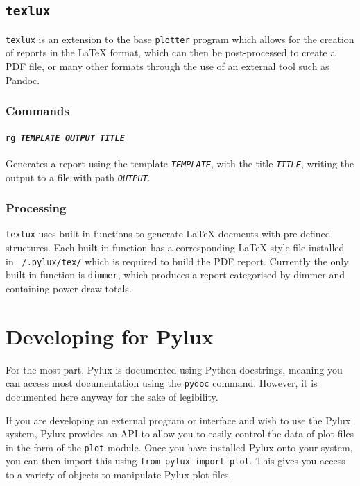 \documentclass[a4paper]{article}
\begin{document}
\subsection{\texttt{texlux}}
\texttt{texlux} is an extension to the base \texttt{plotter} program which allows for the creation of reports in the \LaTeX{} format, which can then be 
post-processed to create a PDF file, or many other formats through the use of 
an external tool such as Pandoc.

\subsubsection{Commands}

\paragraph{\texttt{rg \textit{TEMPLATE OUTPUT TITLE}}}
Generates a report using the template \texttt{\textit{TEMPLATE}}, with the 
title \texttt{\textit{TITLE}}, writing the output to a file with path 
\texttt{\textit{OUTPUT}}.

\subsubsection{Processing}

\texttt{texlux} uses built-in functions to generate \LaTeX{} docments with 
pre-defined structures. Each built-in function has a corresponding \LaTeX{} 
style file installed in \texttt{~/.pylux/tex/} which is required to build the 
PDF report. Currently the only built-in function is \texttt{dimmer}, which 
produces a report categorised by dimmer and containing power draw totals.

\section{Developing for Pylux}
For the most part, Pylux is documented using Python docstrings, meaning you 
can access most documentation using the \texttt{pydoc} command. However, it 
is documented here anyway for the sake of legibility.

If you are developing an external program or interface and wish to use the 
Pylux system, Pylux provides an API to allow you to easily control the data of 
plot files in the form of the \texttt{plot} module. Once you have installed 
Pylux onto your system, you can then import this using 
\texttt{from pylux import plot}. This gives you access to a variety of 
objects to manipulate Pylux plot files.
\end{document}
